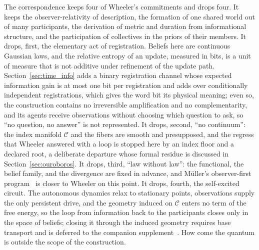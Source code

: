 \documentclass[11pt]{article}
\begin{document}
The correspondence keeps four of Wheeler's commitments and drops four. It keeps the observer-relativity of description, the formation of one shared world out of many participants, the derivation of metric and duration from informational structure, and the participation of collectives in the priors of their members. It drops, first, the elementary act of registration. Beliefs here are continuous Gaussian laws, and the relative entropy of an update, measured in bits, is a unit of measure that is not additive under refinement of the update path. Section~\ref{sec:time_info} adds a binary registration channel whose expected information gain is at most one bit per registration and adds over conditionally independent registrations, which gives the word bit its physical meaning; even so, the construction contains no irreversible amplification and no complementarity, and its agents receive observations without choosing which question to ask, so ``no question, no answer'' is not represented. It drops, second, ``no continuum'': the index manifold $\mathcal{C}$ and the fibers are smooth and presupposed, and the regress that Wheeler answered with a loop is stopped here by an index floor and a declared root, a deliberate departure whose formal residue is discussed in Section~\ref{sec:ouroboros}. It drops, third, ``law without law'': the functional, the belief family, and the divergence are fixed in advance, and M{\"u}ller's observer-first program~\cite{Mueller2020} is closer to Wheeler on this point. It drops, fourth, the self-excited circuit. The autonomous dynamics relax to stationary points, observations supply the only persistent drive, and the geometry induced on $\mathcal{C}$ enters no term of the free energy, so the loop from information back to the participants closes only in the space of beliefs; closing it through the induced geometry requires base transport and is deferred to the companion supplement~\cite{DennisGaugeVFESuppB2026}. How come the quantum is outside the scope of the construction.
\end{document}
